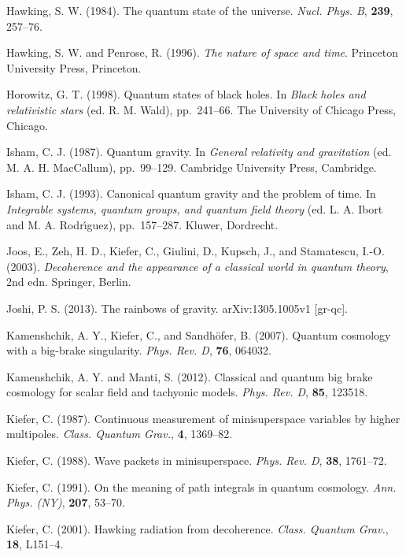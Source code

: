 \documentclass[12pt,a4paper]{article}
\begin{document}
\bibitem{} Hawking, S. W. (1984). The quantum state of the universe.
           {\em Nucl. Phys. B}, {\bf 239}, 257--76.

\bibitem{} Hawking, S. W. and Penrose, R. (1996). {\em The nature
           of space and time}. Princeton University Press, Princeton.

\bibitem{} Horowitz, G. T. (1998). Quantum states of black holes. 
           In {\em Black holes and relativistic stars} (ed. R. M. Wald),
           pp.~241--66. The University of Chicago Press, Chicago.


\bibitem{} Isham, C. J. (1987). Quantum gravity. In {\em General
           relativity and gravitation}
           (ed. M. A. H. MacCallum), pp.~99--129. Cambridge University
           Press, Cambridge.

\bibitem{} Isham, C. J. (1993). Canonical quantum gravity and the problem of
           time. In {\em Integrable systems, quantum groups, and
           quantum field theory} (ed. L. A. Ibort and M. A. Rodr\'{\i}guez),
           pp.~157--287. Kluwer, Dordrecht.


\bibitem{} Joos, E., Zeh, H. D., Kiefer, C., Giulini, D., Kupsch, J., 
           and Stamatescu, I.-O. (2003). {\em Decoherence and the
           appearance of a classical world in quantum theory}, 2nd
           edn. Springer, Berlin.

\bibitem{} Joshi, P. S. (2013). The rainbows of
  gravity. arXiv:1305.1005v1 [gr-qc].

\bibitem{} Kamenshchik, A. Y., Kiefer, C., and Sandh\"ofer, B. (2007).
           Quantum cosmology with a big-brake singularity.
           {\em Phys. Rev. D}, {\bf 76}, 064032.

\bibitem{} Kamenshchik, A. Y. and Manti, S. (2012). Classical and
  quantum big brake cosmology for scalar field and tachyonic models.
 {\em Phys. Rev. D}, {\bf 85}, 123518.

\bibitem{} Kiefer, C. (1987). Continuous measurement of minisuperspace
           variables by higher multipoles. {\em Class. Quantum Grav.},
           {\bf 4}, 1369--82.

\bibitem{} Kiefer, C. (1988). Wave packets in minisuperspace.
           {\em Phys. Rev. D}, {\bf 38}, 1761--72.

\bibitem{} Kiefer, C. (1991). On the meaning of path integrals in
            quantum cosmology. {\em Ann. Phys. (NY)}, {\bf 207}, 53--70.

\bibitem{} Kiefer, C. (2001). Hawking radiation from
  decoherence. {\em Class. Quantum Grav.}, {\bf 18}, L151--4.
\end{document}
